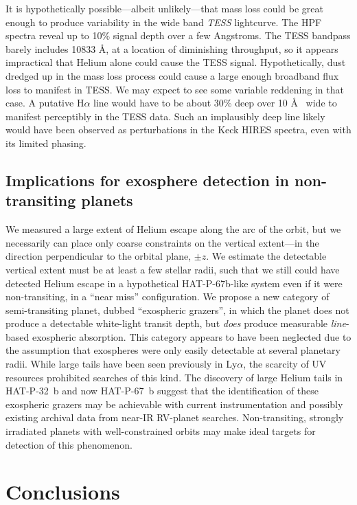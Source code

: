 \documentclass[twocolumn]{aastex631}
\begin{document}
It is hypothetically possible---albeit unlikely---that mass loss could be great enough to produce variability in the wide band \emph{TESS} lightcurve.  The HPF spectra reveal up to 10\% signal depth over a few Angstroms.  The TESS bandpass barely includes 10833 \AA, at a location of diminishing throughput, so it appears impractical that Helium alone could cause the TESS signal.  Hypothetically, dust dredged up in the mass loss process could cause a large enough broadband flux loss to manifest in TESS.  We may expect to see some variable reddening in that case.  A putative H$\alpha$ line would have to be about 30\% deep over 10 \AA~ wide to manifest perceptibly in the TESS data.  Such an implausibly deep line likely would have been observed as perturbations in the Keck HIRES spectra, even with its limited phasing.

\subsection{Implications for exosphere detection in non-transiting planets}

We measured a large extent of Helium escape along the arc of the orbit, but we necessarily can place only coarse constraints on the vertical extent---in the direction perpendicular to the orbital plane, $\pm z$.  We estimate the detectable vertical extent must be at least a few stellar radii, such that we still could have detected Helium escape in a hypothetical HAT-P-67b-like system even if it were non-transiting, in a ``near miss'' configuration.  We propose a new category of semi-transiting planet, dubbed ``exospheric grazers'', in which the planet does not produce a detectable white-light transit depth, but \emph{does} produce measurable \emph{line}-based exospheric absorption.  This category appears to have been neglected due to the assumption that exospheres were only easily detectable at several planetary radii.  While large tails have been seen previously in Ly$\alpha$, the scarcity of UV resources prohibited searches of this kind.  The discovery of large Helium tails in HAT-P-32~b \citep{doi:10.1126/sciadv.adf8736} and now HAT-P-67~b suggest that the identification of these exospheric grazers may be achievable with current instrumentation and possibly existing archival data from near-IR RV-planet searches.  Non-transiting, strongly irradiated planets with well-constrained orbits may make ideal targets for detection of this phenomenon.


\section{Conclusions}
\end{document}

